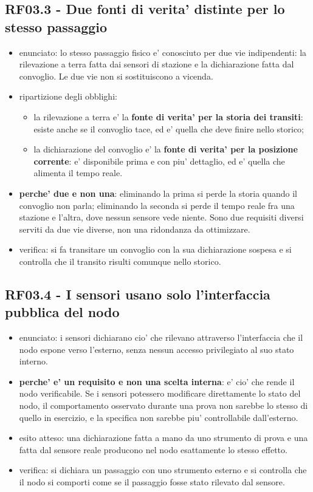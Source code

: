 \documentclass[11pt]{article}
\begin{document}
\subsection{RF03.3 - Due fonti di verita' distinte per lo stesso passaggio}
\label{sec:org303fd56}
\begin{itemize}
\item enunciato: lo stesso passaggio fisico e' conosciuto per due vie indipendenti: la rilevazione a
terra fatta dai sensori di stazione e la dichiarazione fatta dal convoglio. Le due vie non si
sostituiscono a vicenda.
\item ripartizione degli obblighi:
\begin{itemize}
\item la rilevazione a terra e' la \textbf{fonte di verita' per la storia dei transiti}: esiste anche se il
convoglio tace, ed e' quella che deve finire nello storico;
\item la dichiarazione del convoglio e' la \textbf{fonte di verita' per la posizione corrente}: e' disponibile
prima e con piu' dettaglio, ed e' quella che alimenta il tempo reale.
\end{itemize}
\item \textbf{perche' due e non una}: eliminando la prima si perde la storia quando il convoglio non parla;
eliminando la seconda si perde il tempo reale fra una stazione e l'altra, dove nessun sensore vede
niente. Sono due requisiti diversi serviti da due vie diverse, non una ridondanza da ottimizzare.
\item verifica: si fa transitare un convoglio con la sua dichiarazione sospesa e si controlla che il
transito risulti comunque nello storico.
\end{itemize}
\subsection{RF03.4 - I sensori usano solo l'interfaccia pubblica del nodo}
\label{sec:org4a704f1}
\begin{itemize}
\item enunciato: i sensori dichiarano cio' che rilevano attraverso l'interfaccia che il nodo espone
verso l'esterno, senza nessun accesso privilegiato al suo stato interno.
\item \textbf{perche' e' un requisito e non una scelta interna}: e' cio' che rende il nodo verificabile. Se i
sensori potessero modificare direttamente lo stato del nodo, il comportamento osservato durante una
prova non sarebbe lo stesso di quello in esercizio, e la specifica non sarebbe piu' controllabile
dall'esterno.
\item esito atteso: una dichiarazione fatta a mano da uno strumento di prova e una fatta dal sensore reale
producono nel nodo esattamente lo stesso effetto.
\item verifica: si dichiara un passaggio con uno strumento esterno e si controlla che il nodo si comporti
come se il passaggio fosse stato rilevato dal sensore.
\end{itemize}
\end{document}
